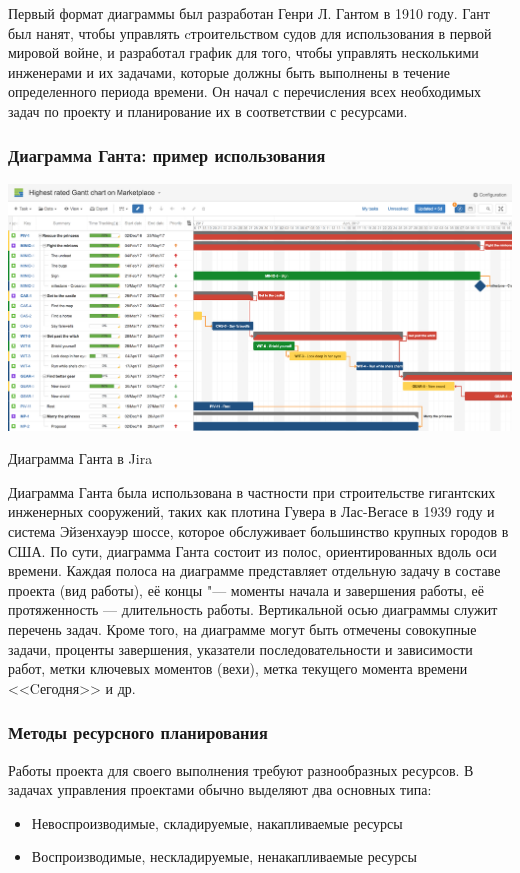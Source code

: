 \documentclass{../industrial-development}
\begin{document}
Первый формат диаграммы был разработан Генри Л. Гантом в 1910 году. Гант был нанят, чтобы управлять cтроительством судов для использования в первой мировой войне, и разработал график для того, чтобы управлять несколькими инженерами и их задачами, которые должны быть выполнены в течение определенного периода времени. Он начал с перечисления всех необходимых задач по проекту и планирование их в соответствии с ресурсами.

    \begin{frame} \frametitle{Диаграмма Ганта: пример использования}
         \centerline{\includegraphics[width=1\textwidth]{gantt.png}}
	\centerline{Диаграмма Ганта в Jira}
    \end{frame}
    \lecturenotes

Диаграмма Ганта была использована в частности при строительстве гигантских инженерных сооружений, таких как плотина Гувера в Лас-Вегасе в 1939 году и система Эйзенхауэр шоссе, которое обслуживает большинство крупных городов в США. 
По сути, диаграмма Ганта состоит из полос, ориентированных вдоль оси времени. Каждая полоса на диаграмме представляет отдельную задачу в составе проекта (вид работы), её концы "--- моменты начала и завершения работы, её протяженность — длительность работы. Вертикальной осью диаграммы служит перечень задач. Кроме того, на диаграмме могут быть отмечены совокупные задачи, проценты завершения, указатели последовательности и зависимости работ, метки ключевых моментов (вехи), метка текущего момента времени <<Cегодня>> и др.

    \begin{frame} \frametitle{Методы ресурсного планирования}
Работы проекта для своего выполнения требуют разнообразных ресурсов. В задачах управления проектами обычно выделяют два основных типа:
        \begin{itemize}
         	  \item Невоспроизводимые, складируемые, накапливаемые ресурсы
	  \item Воспроизводимые, нескладируемые, ненакапливаемые ресурсы
        \end{itemize}
    \end{frame}
    \lecturenotes 
\end{document}
